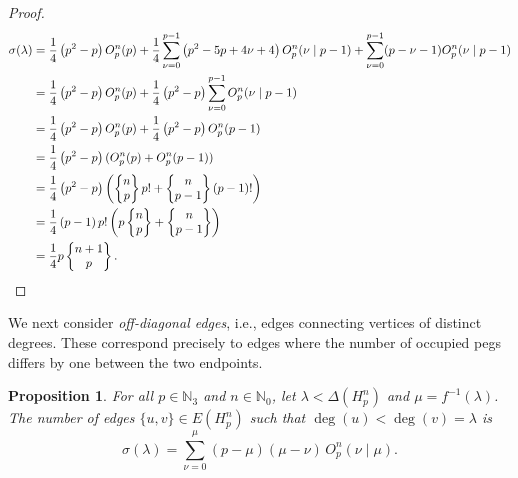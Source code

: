 \documentclass[letterpaper,12pt]{article}
\newtheorem{proposition}{Proposition}
\begin{document}
\begin{proof}
\begingroup
\allowdisplaybreaks
     \begin{align*}
         \sigma(\lambda)&= \dfrac{1}{4}  \left( p^{2} -p  \right) O_p^n(  p)+ \dfrac{1}{4}   \sum_{\nu = 0}^{p-1} \left( p^{2}-5p+4\nu+4 \right) O_p^n(\nu \mid p-1)+\sum_{\nu = 0}^{p-1}  (p-\nu-1) O_p^n(\nu \mid p-1)\\
         &=\dfrac{1}{4}  \left( p^{2} -p  \right) O_p^n(  p)+\dfrac{1}{4}  \left( p^{2} -p  \right)  \sum_{\nu = 0}^{p-1}   O_p^n(\nu \mid p-1)\\
         &=\dfrac{1}{4}  \left( p^{2} -p  \right) O_p^n(  p)+\dfrac{1}{4}  \left( p^{2} -p  \right)    O_p^n(  p-1)\\
         &=\dfrac{1}{4}  \left( p^{2} -p  \right) (O_p^n(  p)+ O_p^n(  p-1))\\
         &=\dfrac{1}{4}  \left( p^{2} -p  \right) \left( \begin{Bmatrix}
             n\\p
         \end{Bmatrix}p! +\begin{Bmatrix}
             n\\p-1
         \end{Bmatrix}(p-1)! \right)\\
         &=\dfrac{1}{4}  \left( p -1  \right) p! \left( p\begin{Bmatrix}
             n\\p
         \end{Bmatrix} +\begin{Bmatrix}
             n\\p-1
         \end{Bmatrix} \right)\\
         &=\dfrac{1}{4}  p\begin{Bmatrix}
             n+1\\p
         \end{Bmatrix}.\qedhere
     \end{align*}
\endgroup
\end{proof}


\noindent
We next consider \emph{off-diagonal edges}, i.e., edges connecting vertices of distinct degrees. These correspond precisely to edges where the number of occupied pegs differs by one between the two endpoints.

\begin{proposition}\label{prop:offdiag-general}  
For all $p \in \mathbb{N}_3$ and $n \in \mathbb{N}_0$,  let   $\lambda < \Delta(H_p^n)$ and  $\mu=f^{-1}(\lambda)$.  
The number of edges $\{u,v\}\in E(H_p^n)$ such that $\deg(u)<\deg(v)=\lambda$ is
\begin{equation}
    \sigma(\lambda)
    = \sum_{\nu = 0}^{\mu} (p-\mu)(\mu-\nu)\,O_p^n(\nu \mid \mu).
\end{equation}
\end{proposition}
\end{document}
